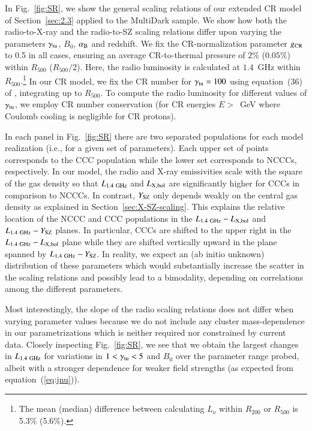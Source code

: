 \documentclass[useAMS,usenatbib]{mn2e}
\begin{document}
In Fig.~\ref{fig:SR}, we show the general scaling relations of our extended CR
model of Section~\ref{sec:2.3} applied to the MultiDark sample. We show how both
the radio-to-X-ray and the radio-to-SZ scaling relations differ upon varying the
parameters $\gamma_{{\mathrm{tu}}}$, $B_{0}$, $\alpha_{{\mathrm{B}}}$ and redshift. We fix
the CR-normalization parameter $g_{{\mathrm{CR}}}$ to 0.5 in all cases, ensuring an
average CR-to-thermal pressure of $2\%$ ($0.05\%$) within $R_{500}$
($R_{500}/2$). Here, the radio luminosity is calculated at $1.4$~GHz within
$R_{500}.$\footnote{The mean (median) difference between calculating $L_{\nu}$
  within $R_{200}$ or $R_{500}$ is 5.3\% (5.6\%).}  In our CR model, we fix the
CR number for $\gamma_{{\mathrm{tu}}}=100$ using equation~(36) of
\cite{2011A&A...527A..99E}, integrating up to $R_{500}$. To compute the radio
luminosity for different values of $\gamma_{{\mathrm{tu}}}$, we employ CR number
conservation (for CR energies $E>$~GeV where Coulomb cooling is negligible for CR
protons).

In each panel in Fig.~\ref{fig:SR} there are two separated populations for
each model realization (i.e., for a given set of parameters). Each upper set of
points corresponds to the CCC population while the lower set corresponds to
NCCCs, respectively. In our model, the radio and X-ray emissivities scale with
the square of the gas density so that $L_{1.4~{\mathrm{GHz}}}$ and $L_{{\mathrm{X,bol}}}$
are significantly higher for CCCs in comparison to NCCCs. In contrast,
$Y_{{\mathrm{SZ}}}$ only depends weakly on the central gas density as explained in
Section~\ref{sec:X-SZ-scaling}. This explains the relative location of the NCCC and
CCC populations in the $L_{1.4~{\mathrm{GHz}}}-L_{{\mathrm{X,bol}}}$ and
$L_{1.4~{\mathrm{GHz}}}-Y_{{\mathrm{SZ}}}$ planes. In particular, CCCs are shifted to the
upper right in the $L_{1.4~{\mathrm{GHz}}}-L_{{\mathrm{X,bol}}}$ plane while they are
shifted vertically upward in the plane spanned by
$L_{1.4~{\mathrm{GHz}}}-Y_{{\mathrm{SZ}}}$. In reality, we expect an (ab initio unknown)
distribution of these parameters which would substantially increase the scatter
in the scaling relations and possibly lead to a bimodality, depending on
correlations among the different parameters.

Most interestingly, the slope of the radio scaling relations does not differ
when varying parameter values because we do not include any cluster
mass-dependence in our parametrizations which is neither required nor
constrained by current data. Closely inspecting Fig.~\ref{fig:SR}, we see that
we obtain the largest changes in $L_{1.4~{\mathrm{GHz}}}$ for variations in
$1<\gamma_{{\mathrm{tu}}}<5$ and $B_0$ over the parameter range probed, albeit with a
stronger dependence for weaker field strengths (as expected from
equation~(\ref{eq:jnu})).
\end{document}
